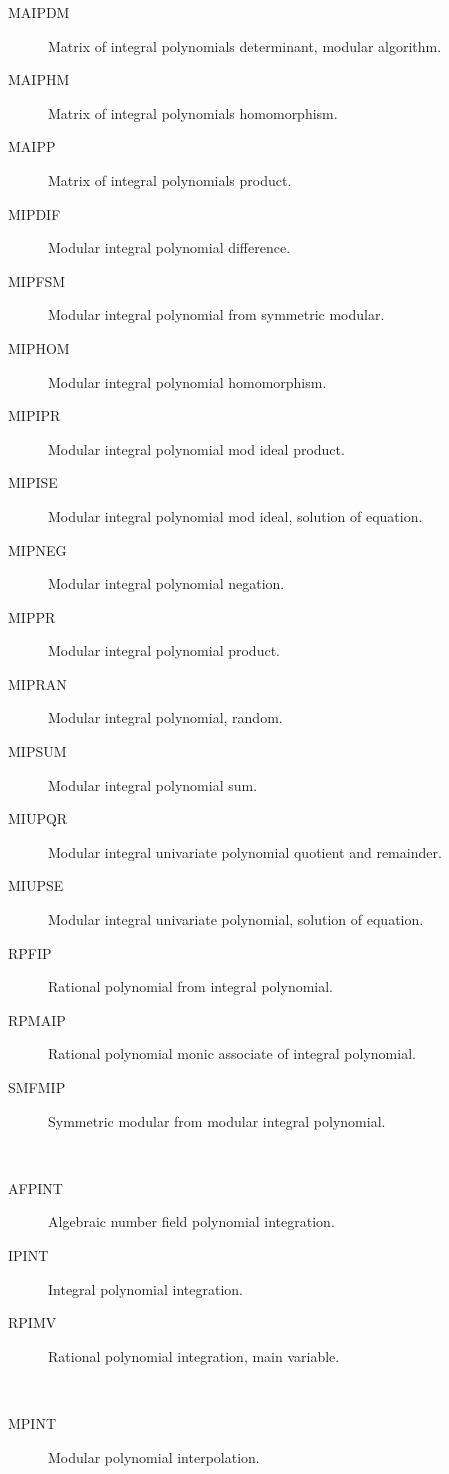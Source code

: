 \begin{description}
\begin{description}
  \item[MAIPDM]  Matrix of integral polynomials determinant, modular
    algorithm.
  \item[MAIPHM]  Matrix of integral polynomials homomorphism.
  \item[MAIPP]  Matrix of integral polynomials product.
  \item[MIPDIF]  Modular integral polynomial difference.
  \item[MIPFSM]  Modular integral polynomial from symmetric modular.
  \item[MIPHOM]  Modular integral polynomial homomorphism.
  \item[MIPIPR]  Modular integral polynomial mod ideal product.
  \item[MIPISE]  Modular integral polynomial mod ideal, solution of equation.
  \item[MIPNEG]  Modular integral polynomial negation.
  \item[MIPPR]  Modular integral polynomial product.
  \item[MIPRAN]  Modular integral polynomial, random.
  \item[MIPSUM]  Modular integral polynomial sum.
  \item[MIUPQR]  Modular integral univariate polynomial quotient and
    remainder.
  \item[MIUPSE]  Modular integral univariate polynomial, solution of equation.
  \item[RPFIP]  Rational polynomial from integral polynomial.
  \item[RPMAIP]  Rational polynomial monic associate of integral polynomial.
  \item[SMFMIP]  Symmetric modular from modular integral polynomial.
  \end{description}
\item[integration] \ \ 
  \begin{description}
  \item[AFPINT]  Algebraic number field polynomial integration.
  \item[IPINT]  Integral polynomial integration.
  \item[RPIMV]  Rational polynomial integration, main variable.
  \end{description}
\item[interpolation] \ \ 
  \begin{description}
  \item[MPINT]  Modular polynomial interpolation.
  \end{description}

\end{description}
